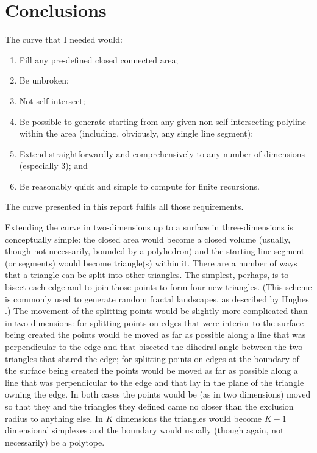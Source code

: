 \documentclass[12pt]{article}
\begin{document}
\section*{Conclusions}

The curve that I needed would:

\begin{enumerate}

\item Fill any pre-defined closed connected area;

\item Be unbroken;

\item Not self-intersect;

\item Be possible to generate starting from any
given non-self-intersecting polyline within the area (including,
obviously, any single line segment);

\item Extend straightforwardly and comprehensively to any number of
 dimensions (especially 3); and

\item Be reasonably quick and simple to compute for finite recursions.

\end{enumerate}

\noindent
The curve presented in this report fulfils all those requirements.

Extending the curve in two-dimensions up to a surface in
three-dimensions is conceptually simple: the closed area would become
a closed volume (usually, though not necessarily, bounded by a
polyhedron) and the starting line segment (or segments) would become
triangle(s) within it.  There are a number of ways that a triangle can
be split into other triangles.  The simplest, perhaps, is to bisect
each edge and to join those points to form four new triangles.  (This
scheme is commonly used to generate random fractal landscapes, as
described by Hughes \cite{landscape}.)  The movement of the
splitting-points would be slightly more complicated than in two
dimensions: for splitting-points on edges that were interior to the
surface being created the points would be moved as far as possible
along a line that was perpendicular to the edge and that bisected the
dihedral angle between the two triangles that shared the edge; for
splitting points on edges at the boundary of the surface being created
the points would be moved as far as possible along a line that was
perpendicular to the edge and that lay in the plane of the triangle
owning the edge.  In both cases the points would be (as in two
dimensions) moved so that they and the triangles they defined came no
closer than the exclusion radius to anything else.  In $K$ dimensions
the triangles would become $K-1$ dimensional simplexes and the
boundary would usually (though again, not necessarily) be a polytope.
\end{document}
